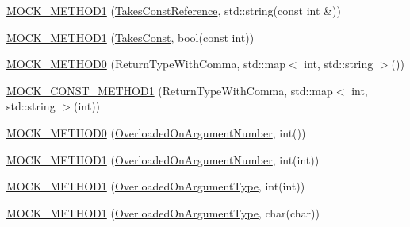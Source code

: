 \begin{DoxyCompactItemize}
\item 
\mbox{\hyperlink{classtesting_1_1gmock__generated__function__mockers__test_1_1_mock_foo_a94d9e3801000de6dec4b4394a12a9349}{M\+O\+C\+K\+\_\+\+M\+E\+T\+H\+O\+D1}} (\mbox{\hyperlink{classtesting_1_1gmock__generated__function__mockers__test_1_1_foo_interface_aae85be7a3d1b53625fbeeac4694292d3}{Takes\+Const\+Reference}}, std\+::string(const int \&))
\item 
\mbox{\hyperlink{classtesting_1_1gmock__generated__function__mockers__test_1_1_mock_foo_a7b548776b156454bcddecaca6294c52f}{M\+O\+C\+K\+\_\+\+M\+E\+T\+H\+O\+D1}} (\mbox{\hyperlink{classtesting_1_1gmock__generated__function__mockers__test_1_1_foo_interface_a8c53e87edf0b9da878e5259f02b7f5dc}{Takes\+Const}}, bool(const int))
\item 
\mbox{\hyperlink{classtesting_1_1gmock__generated__function__mockers__test_1_1_mock_foo_adda63f3a046fadc9ad44731240d441e2}{M\+O\+C\+K\+\_\+\+M\+E\+T\+H\+O\+D0}} (Return\+Type\+With\+Comma, std\+::map$<$ int, std\+::string $>$())
\item 
\mbox{\hyperlink{classtesting_1_1gmock__generated__function__mockers__test_1_1_mock_foo_a921e9d77c56ab58ef3881de92ffa3ae0}{M\+O\+C\+K\+\_\+\+C\+O\+N\+S\+T\+\_\+\+M\+E\+T\+H\+O\+D1}} (Return\+Type\+With\+Comma, std\+::map$<$ int, std\+::string $>$(int))
\item 
\mbox{\hyperlink{classtesting_1_1gmock__generated__function__mockers__test_1_1_mock_foo_a1666c565d1b48b351a1a453f6f87ff22}{M\+O\+C\+K\+\_\+\+M\+E\+T\+H\+O\+D0}} (\mbox{\hyperlink{classtesting_1_1gmock__generated__function__mockers__test_1_1_foo_interface_ae9e86ac64fa9acedfb1fa747174c7f43}{Overloaded\+On\+Argument\+Number}}, int())
\item 
\mbox{\hyperlink{classtesting_1_1gmock__generated__function__mockers__test_1_1_mock_foo_a45014dba5c27e9d59af3a94e0d324096}{M\+O\+C\+K\+\_\+\+M\+E\+T\+H\+O\+D1}} (\mbox{\hyperlink{classtesting_1_1gmock__generated__function__mockers__test_1_1_foo_interface_ae9e86ac64fa9acedfb1fa747174c7f43}{Overloaded\+On\+Argument\+Number}}, int(int))
\item 
\mbox{\hyperlink{classtesting_1_1gmock__generated__function__mockers__test_1_1_mock_foo_ad900c5945fc52a0a95ca1480207c7add}{M\+O\+C\+K\+\_\+\+M\+E\+T\+H\+O\+D1}} (\mbox{\hyperlink{classtesting_1_1gmock__generated__function__mockers__test_1_1_foo_interface_ad9cc9a11570403fb8378ed6620892ec6}{Overloaded\+On\+Argument\+Type}}, int(int))
\item 
\mbox{\hyperlink{classtesting_1_1gmock__generated__function__mockers__test_1_1_mock_foo_ab4b323a9c06a48c1116d55419195c1a6}{M\+O\+C\+K\+\_\+\+M\+E\+T\+H\+O\+D1}} (\mbox{\hyperlink{classtesting_1_1gmock__generated__function__mockers__test_1_1_foo_interface_ad9cc9a11570403fb8378ed6620892ec6}{Overloaded\+On\+Argument\+Type}}, char(char))

\end{DoxyCompactItemize}
